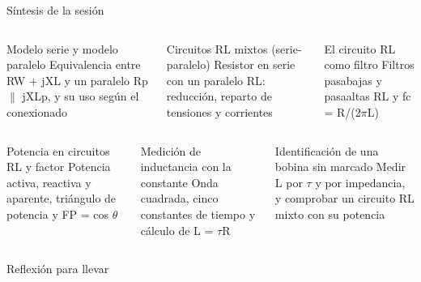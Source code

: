 \documentclass[aspectratio=169,11pt,xcolor={table}]{beamer}
\begin{document}
\begin{frame}{Síntesis de la sesión}
\begin{columns}[T,onlytextwidth]
\begin{cardB}{Modelo serie y modelo paralelo}
\scriptsize Equivalencia entre RW + jXL y un paralelo Rp \ensuremath{\parallel} jXLp, y su uso según el conexionado
\end{cardB}
\begin{cardO}{Circuitos RL mixtos (serie-paralelo)}
\scriptsize Resistor en serie con un paralelo RL: reducción, reparto de tensiones y corrientes
\end{cardO}
\begin{cardG}{El circuito RL como filtro}
\scriptsize Filtros pasabajas y pasaaltas RL y fc = R/(2\ensuremath{\pi}L)
\end{cardG}
\end{columns}
\vspace{2mm}
\begin{columns}[T,onlytextwidth]
\begin{cardB}{Potencia en circuitos RL y factor}
\scriptsize Potencia activa, reactiva y aparente, triángulo de potencia y FP = cos \ensuremath{\theta}
\end{cardB}
\begin{cardO}{Medición de inductancia con la constante}
\scriptsize Onda cuadrada, cinco constantes de tiempo y cálculo de L = \ensuremath{\tau}R
\end{cardO}
\begin{cardG}{Identificación de una bobina sin marcado}
\scriptsize Medir L por \ensuremath{\tau} y por impedancia, y comprobar un circuito RL mixto con su potencia
\end{cardG}
\end{columns}
\end{frame}

\begin{frame}{Reflexión para llevar}
\centering
{}
\end{frame}
\end{document}
